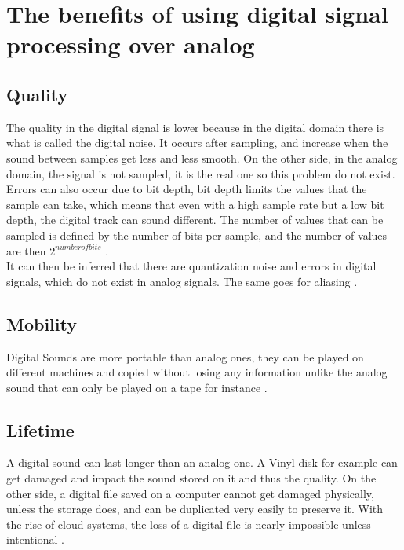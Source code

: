 \section{The benefits of using digital signal processing over analog}
\subsection{Quality}


The quality in the digital signal is  lower because in the digital domain there is what is called the digital noise. It occurs after sampling, and increase when the sound between samples get less and less smooth. On the other side, in the analog domain, the signal is not sampled, it is the real one so this problem do not exist. Errors can also occur due to bit depth, bit depth limits the values that the sample can take, which means that even with a high sample rate but a low bit depth, the digital track can sound different. The number of values that can be sampled is defined by the number of bits per sample, and the number of values are then $2^{number of bits}$ \citep{analog_quality}.\\
It can then be inferred that there are quantization noise and errors in digital signals, which do not exist in analog signals. The same goes for aliasing \citep{analog_aliasing}. 

\subsection{Mobility}

Digital Sounds are more portable than analog ones, they can be played on different machines and copied without losing any information unlike the analog sound that can only be played on a tape for instance \citep{analog_quality}. 

\subsection{Lifetime}

A digital sound can last longer than an analog one. A Vinyl disk for example can get damaged and impact the sound stored on it and thus the quality. On the other side, a digital file saved on a computer cannot get damaged physically, unless the storage does, and can be duplicated very easily to preserve it. With the rise of cloud systems, the loss of a digital file is nearly impossible unless intentional \citep{analog_storage}.


